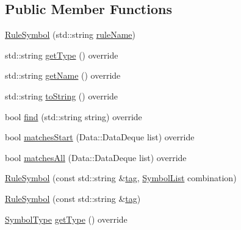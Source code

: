 \subsection*{Public Member Functions}
\begin{DoxyCompactItemize}
\item 
\mbox{\hyperlink{class_erable_1_1_compiler_1_1_symbols_1_1_rule_symbol_af75295d9b0da7b246e1e28e662973940}{Rule\+Symbol}} (std\+::string \mbox{\hyperlink{class_erable_1_1_compiler_1_1_symbols_1_1_rule_symbol_a776f254959afc7fe4f4865f15673d5b8}{rule\+Name}})
\item 
std\+::string \mbox{\hyperlink{class_erable_1_1_compiler_1_1_symbols_1_1_rule_symbol_af232c9c3213aad7b033b402ceb8ef388}{get\+Type}} () override
\item 
std\+::string \mbox{\hyperlink{class_erable_1_1_compiler_1_1_symbols_1_1_rule_symbol_a5f6cb5a2fc49bc62cc61035cc99464ca}{get\+Name}} () override
\item 
std\+::string \mbox{\hyperlink{class_erable_1_1_compiler_1_1_symbols_1_1_rule_symbol_a4fc1d4bfd6e2587308dc274fa0934511}{to\+String}} () override
\item 
bool \mbox{\hyperlink{class_erable_1_1_compiler_1_1_symbols_1_1_rule_symbol_a7af57723a2a59dbccf8cbe409f019a10}{find}} (std\+::string string) override
\item 
bool \mbox{\hyperlink{class_erable_1_1_compiler_1_1_symbols_1_1_rule_symbol_a965c2e3ba84c2e93c5ebbce5003b721b}{matches\+Start}} (Data\+::\+Data\+Deque list) override
\item 
bool \mbox{\hyperlink{class_erable_1_1_compiler_1_1_symbols_1_1_rule_symbol_a690e797889b403487385955dc3fe7501}{matches\+All}} (Data\+::\+Data\+Deque list) override
\item 
\mbox{\hyperlink{class_erable_1_1_compiler_1_1_symbols_1_1_rule_symbol_ae5dca56ce1845eb79ed91be9cc9bd1c5}{Rule\+Symbol}} (const std\+::string \&\mbox{\hyperlink{class_erable_1_1_compiler_1_1_symbols_1_1_symbol_a09df8dce9bee3576451b880fc651506d}{tag}}, \mbox{\hyperlink{namespace_erable_1_1_compiler_1_1_symbols_a63e8157d2f729d4689d27bacad42f8ed}{Symbol\+List}} combination)
\item 
\mbox{\hyperlink{class_erable_1_1_compiler_1_1_symbols_1_1_rule_symbol_ad38168d91061dcb689ea13c46b00d5b7}{Rule\+Symbol}} (const std\+::string \&\mbox{\hyperlink{class_erable_1_1_compiler_1_1_symbols_1_1_symbol_a09df8dce9bee3576451b880fc651506d}{tag}})
\item 
\mbox{\hyperlink{namespace_erable_1_1_compiler_1_1_symbols_a3b60ec10cda0920ec4368128361b8320}{Symbol\+Type}} \mbox{\hyperlink{class_erable_1_1_compiler_1_1_symbols_1_1_rule_symbol_a0497f4aa633b946b4a418d5bde3e96fd}{get\+Type}} () override

\end{DoxyCompactItemize}
